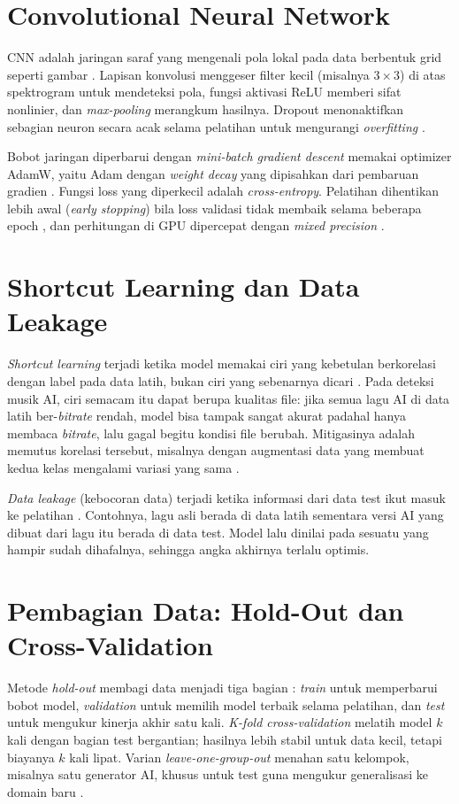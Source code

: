 \section{Convolutional Neural Network}
CNN adalah jaringan saraf yang mengenali pola lokal pada data berbentuk grid seperti gambar \cite{lecun1998gradient}. Lapisan konvolusi menggeser filter kecil (misalnya $3\times3$) di atas spektrogram untuk mendeteksi pola, fungsi aktivasi ReLU memberi sifat nonlinier, dan \textit{max-pooling} merangkum hasilnya. Dropout menonaktifkan sebagian neuron secara acak selama pelatihan untuk mengurangi \textit{overfitting} \cite{srivastava2014dropout}.

Bobot jaringan diperbarui dengan \textit{mini-batch gradient descent} memakai optimizer AdamW, yaitu Adam dengan \textit{weight decay} yang dipisahkan dari pembaruan gradien \cite{loshchilov2019adamw}. Fungsi loss yang diperkecil adalah \textit{cross-entropy}. Pelatihan dihentikan lebih awal (\textit{early stopping}) bila loss validasi tidak membaik selama beberapa epoch \cite{prechelt1998early}, dan perhitungan di GPU dipercepat dengan \textit{mixed precision} \cite{micikevicius2018mixed}.

\section{Shortcut Learning dan Data Leakage}
\textit{Shortcut learning} terjadi ketika model memakai ciri yang kebetulan berkorelasi dengan label pada data latih, bukan ciri yang sebenarnya dicari \cite{geirhos2020shortcut}. Pada deteksi musik AI, ciri semacam itu dapat berupa kualitas file: jika semua lagu AI di data latih ber-\textit{bitrate} rendah, model bisa tampak sangat akurat padahal hanya membaca \textit{bitrate}, lalu gagal begitu kondisi file berubah. Mitigasinya adalah memutus korelasi tersebut, misalnya dengan augmentasi data yang membuat kedua kelas mengalami variasi yang sama \cite{salamon2017deep}.

\textit{Data leakage} (kebocoran data) terjadi ketika informasi dari data test ikut masuk ke pelatihan \cite{kaufman2012leakage}. Contohnya, lagu asli berada di data latih sementara versi AI yang dibuat dari lagu itu berada di data test. Model lalu dinilai pada sesuatu yang hampir sudah dihafalnya, sehingga angka akhirnya terlalu optimis.

\section{Pembagian Data: Hold-Out dan Cross-Validation}
Metode \textit{hold-out} membagi data menjadi tiga bagian \cite{kohavi1995study}: \textit{train} untuk memperbarui bobot model, \textit{validation} untuk memilih model terbaik selama pelatihan, dan \textit{test} untuk mengukur kinerja akhir satu kali. \textit{K-fold cross-validation} melatih model $k$ kali dengan bagian test bergantian; hasilnya lebih stabil untuk data kecil, tetapi biayanya $k$ kali lipat. Varian \textit{leave-one-group-out} menahan satu kelompok, misalnya satu generator AI, khusus untuk test guna mengukur generalisasi ke domain baru \cite{gulrajani2021search}.

